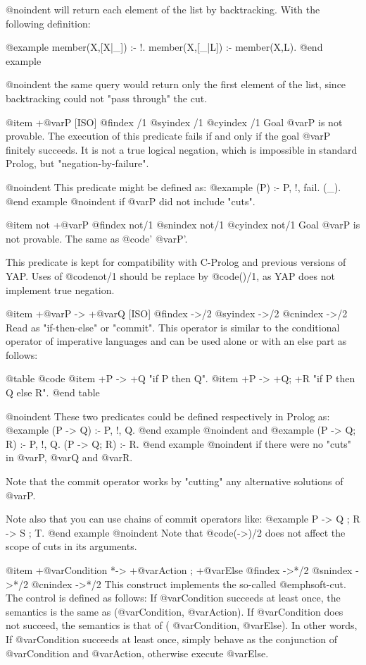 {{{{@noindent
will return each element of the list by backtracking. With the following
definition:

@example
 member(X,[X|_]) :- !.
 member(X,[_|L]) :- member(X,L).
@end example

@noindent
the same query would return only the first element of the 
list, since backtracking could not "pass through" the cut.

@item \+ +@var{P} [ISO]
@findex \+/1
@syindex \+/1
@cyindex \+/1
Goal @var{P} is not provable. The execution of this predicate fails if
and only if the goal @var{P} finitely succeeds. It is not a true logical
negation, which is impossible in standard Prolog, but
"negation-by-failure".

@noindent
This predicate might be defined as:
@example
 \+(P) :- P, !, fail.
 \+(_).
@end example
@noindent
if @var{P} did not include "cuts".

@item not +@var{P}
@findex not/1
@snindex not/1
@cyindex not/1
Goal @var{P} is not provable. The same as @code{'\+ @var{P}'}.

This predicate is kept for compatibility with C-Prolog and previous
versions of YAP. Uses of @code{not/1} should be replace by
@code{(\+)/1}, as YAP does not implement true negation.

@item  +@var{P} -> +@var{Q} [ISO]
@findex ->/2
@syindex ->/2
@cnindex ->/2
Read as "if-then-else" or "commit". This operator is similar to the
conditional operator of imperative languages and can be used alone or
with an else part as follows:

@table @code
@item +P -> +Q
"if P then Q".
@item +P -> +Q; +R
"if P then Q else R".
@end table

@noindent
These two predicates could be defined respectively in Prolog as:
@example
 (P -> Q) :- P, !, Q.
@end example
@noindent
and
@example
 (P -> Q; R) :- P, !, Q.
 (P -> Q; R) :- R.
@end example
@noindent
if there were no "cuts" in @var{P}, @var{Q} and @var{R}.

Note that the commit operator works by "cutting" any alternative
solutions of @var{P}.

Note also that you can use chains of commit operators like:
@example
    P -> Q ; R -> S ; T.
@end example
@noindent
Note that @code{(->)/2} does not affect the scope of cuts in its
arguments.

@item  +@var{Condition} *-> +@var{Action} ; +@var{Else}
@findex ->*/2
@snindex ->*/2
@cnindex ->*/2
This construct implements the so-called @emph{soft-cut}. The control is
    defined as follows: If @var{Condition} succeeds at least once, the
    semantics is the same as (@var{Condition}, @var{Action}). If
    @var{Condition} does not succeed, the semantics is that of (\+
    @var{Condition}, @var{Else}). In other words, If @var{Condition}
    succeeds at least once, simply behave as the conjunction of
    @var{Condition} and @var{Action}, otherwise execute @var{Else}.

}}}}
